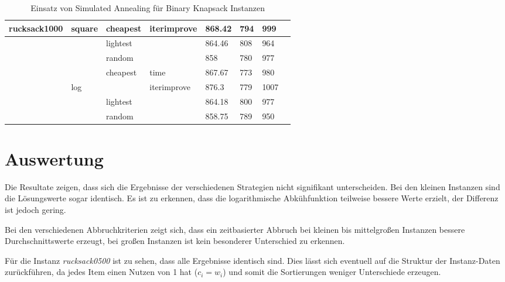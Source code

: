\documentclass[11pt,a4paper]{article}
\begin{document}
\begin{table}[!t]
\begin{tabular}{ | l | l | l | l | l | l | l | l | }
        rucksack1000 & square & cheapest & iterimprove & 868.42 & 794 & 999 \\ \hline
        &            & lightest & & 864.46 & 808 & 964 \\ \hline
        &            & random & & \textcolor{BrickRed}{858} & 780 & 977 \\ \hline
        &            & cheapest & time & 867.67 & 773 & 980 \\ \hline
        & log        & & iterimprove & \textcolor{OliveGreen}{876.3} & 779 & \textcolor{OliveGreen}{1007} \\ \hline
        &            & lightest & & 864.18 & 800 & 977 \\ \hline
        &            & random & & 858.75 & 789 & \textcolor{BrickRed}{950} \\ \hline
  \end{tabular}
    \caption{Einsatz von Simulated Annealing für Binary Knapsack Instanzen}
    \label{tab:results}
\end{table}

\clearpage

\section{Auswertung}

Die Resultate zeigen, dass sich die Ergebnisse der verschiedenen Strategien nicht signifikant unterscheiden. Bei den kleinen Instanzen sind die Lösungswerte sogar identisch. Es ist zu erkennen, dass die logarithmische Abkühfunktion teilweise bessere Werte erzielt, der Differenz ist jedoch gering.

Bei den verschiedenen Abbruchkriterien zeigt sich, dass ein zeitbasierter Abbruch bei kleinen bis mittelgroßen Instanzen bessere Durchschnittswerte erzeugt, bei großen Instanzen ist kein besonderer Unterschied zu erkennen.

Für die Instanz \textit{rucksack0500} ist zu sehen, dass alle Ergebnisse identisch sind. Dies lässt sich eventuell auf die Struktur der Instanz-Daten zurückführen, da jedes Item einen Nutzen von 1 hat (\(c_i = w_i\)) und somit die Sortierungen weniger Unterschiede erzeugen.
\end{document}
